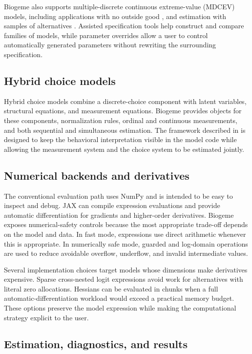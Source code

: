 \documentclass[11pt]{article}
\begin{document}
Biogeme also supports multiple-discrete continuous extreme-value (MDCEV)
models, including applications with no outside good \citep{BierlaireWang2024},
and estimation with samples of alternatives \citep{BierlairePaschalidis2023}.
Assisted specification tools help construct and compare families of models,
while parameter overrides allow a user to control automatically generated
parameters without rewriting the surrounding specification.

\subsection{Hybrid choice models}

Hybrid choice models combine a discrete-choice component with latent variables,
structural equations, and measurement equations. Biogeme provides objects for
these components, normalization rules, ordinal and continuous measurements,
and both sequential and simultaneous estimation. The framework described in
\citet{Bierlaire2016Latent,BierlaireBenAkivaWalker2026} is designed to keep the
behavioral interpretation visible in the model code while allowing the
measurement system and the choice system to be estimated jointly.

\subsection{Numerical backends and derivatives}

The conventional evaluation path uses NumPy and is intended to be easy to
inspect and debug. JAX can compile expression evaluations and provide automatic
differentiation for gradients and higher-order derivatives. Biogeme exposes
numerical-safety controls because the most appropriate trade-off depends on the
model and data. In fast mode, expressions use direct arithmetic whenever this
is appropriate. In numerically safe mode, guarded and log-domain operations
are used to reduce avoidable overflow, underflow, and invalid intermediate
values.

Several implementation choices target models whose dimensions make derivatives
expensive. Sparse cross-nested logit expressions avoid work for alternatives
with literal zero allocations. Hessians can be evaluated in chunks when a full
automatic-differentiation workload would exceed a practical memory budget.
These options preserve the model expression while making the computational
strategy explicit to the user.

\subsection{Estimation, diagnostics, and results}
\end{document}
